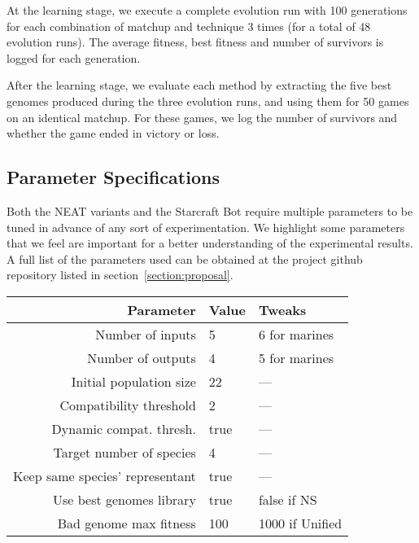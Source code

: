 At the learning stage, we execute a complete evolution run with 100
generations for each combination of matchup and technique 3 times (for
a total of 48 evolution runs). The average fitness, best fitness and
number of survivors is logged for each generation.

After the learning stage, we evaluate each method by extracting the
five best genomes produced during the three evolution runs, and using
them for 50 games on an identical matchup. For these games, we log
the number of survivors and whether the game ended in victory or loss.

\subsection{Parameter Specifications}

Both the NEAT variants and the Starcraft Bot require multiple
parameters to be tuned in advance of any sort of experimentation. We
highlight some parameters that we feel are important for a better
understanding of the experimental results. A full list of the
parameters used can be obtained at the project github repository
listed in section~\ref{section:proposal}.


\begin{tabular}{rll}
    \toprule
    Parameter & Value & Tweaks \\
    \midrule
    Number of inputs & 5 & 6 for marines \\
    Number of outputs & 4 & 5 for marines \\
    Initial population size & 22  & — \\[1ex]

    Compatibility threshold & 2 & — \\
    Dynamic compat. thresh. & true & — \\
    Target number of species & 4 & — \\
    Keep same species' representant & true & — \\[1ex]

    Use best genomes library & true & false if NS \\
    Bad genome max fitness & 100 & 1000 if Unified \\
    \bottomrule
\end{tabular}

